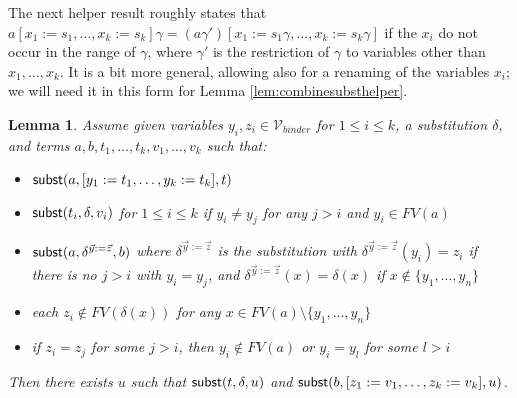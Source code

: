\documentclass{lmcs}
\theoremstyle{theorem}\newtheorem{theorem}{Theorem}
\theoremstyle{theorem}\newtheorem{lemma}[theorem]{Lemma}
\theoremstyle{theorem}\newtheorem{corollary}[theorem]{Corollary}
\theoremstyle{definition}\newtheorem{definition}[theorem]{Definition}
\theoremstyle{definition}\newtheorem{example}[theorem]{Example}
\newcommand{\Vbound}{\mathcal{V}_{\mathit{binder}}}
\newcommand{\FV}{\mathit{FV}}
\newcommand{\avar}{x}
\newcommand{\bvar}{y}
\newcommand{\cvar}{z}
\begin{document}
The next helper result roughly states that $a[\avar_1:=s_1,\dots,\avar_k:=s_k]\gamma =
(a\gamma')[\avar_1:=s_1\gamma,\dots,\avar_k:=s_k\gamma]$ if the $\avar_i$ do not occur in the range
of $\gamma$, where $\gamma'$ is the restriction of $\gamma$ to variables other than $\avar_1,\dots,
\avar_k$.  It is a bit more general, allowing also for a renaming of the variables $\avar_i$; we
will need it in this form for Lemma \ref{lem:combinesubsthelper}.

\begin{lemma}\label{lem:switchordercombihelper}
Assume given variables $\bvar_i,\cvar_i \in \Vbound$ for $1 \leq i \leq k$,
a substitution $\delta$,
and terms $a,b,t_1,\dots,t_k,v_1,\dots,v_k$ such that:
\begin{itemize}
\item $\subrel{a,[\bvar_1:=t_1,\dots,\bvar_k:=t_k],t}$
\item $\mathsf{subst}(t_i,\delta,v_i)$ for $1 \leq i \leq k$ if $\bvar_i \neq \bvar_j$ for any $j > i$ and
  $\bvar_i \in \FV(a)$
\item $\subrel{a,\delta^{\vec{\bvar}:=\vec{\cvar}},b}$ where $\delta^{\vec{\bvar}:=\vec{\cvar}}$ is the
  substitution with $\delta^{\vec{\bvar}:=\vec{\cvar}}(\bvar_i) = \cvar_i$ if there is no $j > i$ with
  $\bvar_i = \bvar_j$, and $\delta^{\vec{\bvar}:=\vec{\cvar}}(\avar) = \delta(\avar)$ if $\avar \notin
  \{\bvar_1,\dots,\bvar_n\}$
\item each $\cvar_i \notin \FV(\delta(\avar))$ for any $\avar \in \FV(a) \setminus \{\bvar_1,\dots,\bvar_n\}$
\item if $\cvar_i = \cvar_j$ for some $j > i$, then $\bvar_i \notin \FV(a)$ or $\bvar_i = \bvar_l$ for some $l > i$ 
\end{itemize}
Then there exists $u$ such that $\mathsf{subst}(t,\delta,u)$ and $\subrel{b,[\cvar_1:=v_1,\dots,\cvar_k:=
v_k],u}$.
\end{lemma}
\end{document}
